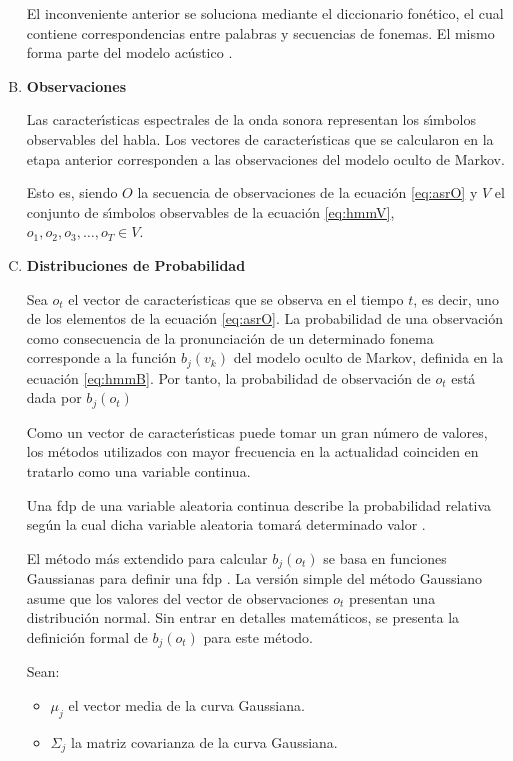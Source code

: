 \begin{enumerate}[A)]
	El inconveniente anterior se soluciona mediante el diccionario fon\'etico, el cual contiene correspondencias entre palabras y secuencias de fonemas. El mismo forma parte del modelo ac\'ustico \cite{huang-handbook10}.

	\item \textbf{Observaciones}


	Las caracter{\'\i}sticas espectrales de la onda sonora representan los s{\'\i}mbolos observables del habla.
	Los vectores de caracter{\'\i}sticas que se calcularon en la etapa anterior corresponden a las observaciones
	del modelo oculto de Markov.

	Esto es, siendo $O$ la secuencia de observaciones de la ecuaci\'on \ref{eq:asrO} 
	y $V$ el conjunto de s{\'\i}mbolos observables de la ecuaci\'on \ref{eq:hmmV}, $o_1,o_2,o_3,\ldots,o_T \in V$.

	\item \textbf{Distribuciones de Probabilidad}

	Sea $o_t$ el vector de caracter{\'\i}sticas que se observa en el tiempo $t$, es decir, uno de los elementos
	de la ecuaci\'on \ref{eq:asrO}.
	La probabilidad de una observaci\'on como consecuencia de la pronunciaci\'on de un determinado fonema 
	corresponde a la funci\'on $b_j(v_k)$ del modelo oculto de Markov, definida en la ecuaci\'on \ref{eq:hmmB}.
	Por tanto, la probabilidad de observaci\'on de $o_t$ est\'a dada por $b_j(o_t)$ 

	Como un vector de caracter{\'\i}sticas puede tomar un gran n\'umero de valores, los m\'etodos utilizados con
	mayor frecuencia en la actualidad coinciden en tratarlo como una variable continua.

	Una \gls{fdp} de una variable aleatoria continua describe la probabilidad relativa seg\'un la cual 
	dicha variable aleatoria tomar\'a determinado valor \cite{Evans2011}.

	El m\'etodo m\'as extendido para calcular $b_j(o_t)$ se basa en funciones Gaussianas para definir 
	una \gls{fdp} \cite{Jurafsky}.
	La versi\'{o}n simple del m\'etodo Gaussiano asume que los valores del vector de observaciones $o_t$ presentan una distribuci\'on normal. Sin entrar en detalles matem\'aticos, se presenta la definici\'on formal 
	de $b_j(o_t)$ para este m\'etodo.

	Sean:

	\begin{itemize}
		\item $\mu_j$ el vector media de la curva Gaussiana.
		\item $\Sigma_j$ la matriz covarianza de la curva Gaussiana.
	\end{itemize}


\end{enumerate}
